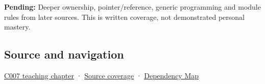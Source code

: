 \textbf{Pending:} Deeper ownership, pointer/reference, generic programming and module rules from later sources. This is written coverage, not demonstrated personal mastery.

\subsection{Source and navigation}\label{appendix-49d27bc9d9a5-source-and-navigation}

\hyperref[01-foundations-i-ch002-many-files-must-describe-one-coherent-program]{C007 teaching chapter} · \hyperref[appendix-fd090d982a15-m007---parts-101-112]{Source coverage} · \hyperref[appendix-4ad47bdd269a]{Dependency Map}
